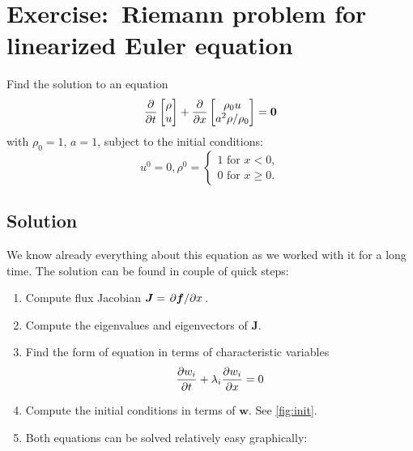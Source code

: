 \documentclass[justified, nobib,a4paper]{tufte-handout}
\newcommand{\Q}[1]{\section{Exercise:~{#1}}}
\newcommand{\Sol}{\subsection{Solution}}
\begin{document}
\Q{Riemann problem for linearized Euler equation}
Find the solution to an equation
\[
	\pdv{}{t}
	\begin{bmatrix}
		\rho \\
		u
	\end{bmatrix} +
	\pdv{}{x}
	\begin{bmatrix}
		\rho_0 u \\
		a^2\rho/\rho_0
	\end{bmatrix} = \bm{0}
\]
with $\rho_0=1$, $a=1$, subject to the initial conditions:
\[
	u^0 = 0, \rho^0 = \begin{cases}
		1 \text{ for } x < 0, \\
		0  \text{ for } x \geq 0.
	\end{cases}
\]
\Sol
We know already everything about this equation as we worked with it for a long time. The solution can be found in couple of
quick steps:
\begin{enumerate}
	\item Compute flux Jacobian $\bm{J} = \pdv{\bm{f}}/{x}$.
	\item Compute the eigenvalues and eigenvectors of $\bm{J}$.
	\item Find the form of equation in terms of characteristic variables
	      \[
		      \pdv{w_i}{t} + \lambda_i\pdv{w_i}{x} = 0
	      \]
	\item Compute the initial conditions in terms of $\bm{w}$. See \cref{fig:init}.
	\item Both equations can be solved relatively easy graphically:

\end{enumerate}
\end{document}
